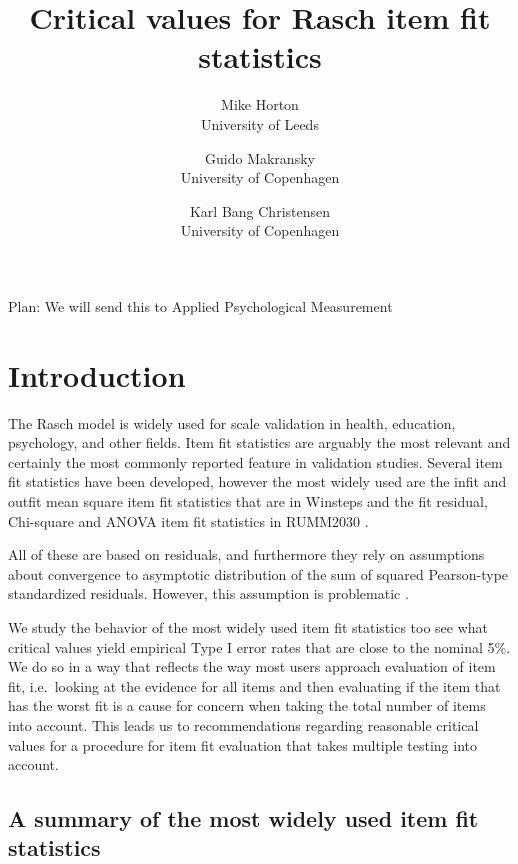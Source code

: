 \documentclass{article}
\begin{document}
\title{Critical values for Rasch item fit statistics}

\author{Mike Horton\\ University of Leeds  \and Guido Makransky\\ University of Copenhagen \and Karl Bang Christensen\\ University of Copenhagen}


\maketitle

Plan: We will send this to Applied Psychological Measurement



\section{Introduction}

The Rasch model \cite{rasch1960,Fischer-Molenaar1995,christensen-kreiner-mesbah2013} is widely used for scale validation in health, education, psychology, and other fields. Item fit statistics are arguably the most relevant and certainly the most commonly reported feature in validation studies. Several item fit statistics have been developed, however the most widely used are the infit and outfit mean square item fit statistics \cite{wright-stone,wright-masters} that are in Winsteps \cite{winsteps} and the fit residual, Chi-square and ANOVA item fit statistics in RUMM2030 \cite{RUMM}.

All of these are based on residuals, and furthermore they rely on assumptions about convergence to asymptotic distribution of the sum of squared Pearson-type standardized residuals. However, this assumption is problematic \cite{jennings1986}.

We study the behavior of the most widely used item fit statistics too see what critical values yield empirical Type I error rates that are close to the nominal 5\%. We do so in a way that reflects the way most users approach evaluation of item fit, i.e.\ looking at the evidence for all items and then evaluating if the item that has the worst fit is a cause for concern when taking the total number of items into account. This leads us to recommendations regarding reasonable critical values for a procedure for item fit evaluation that takes multiple testing into account.



\subsection{A summary of the most widely used item fit statistics}
\end{document}

